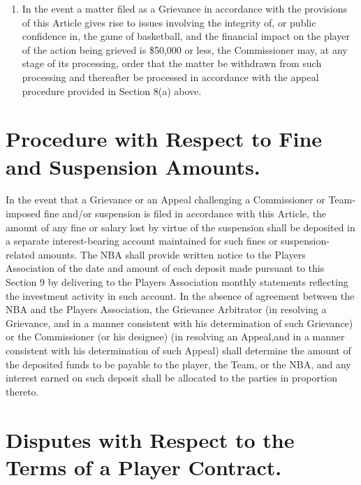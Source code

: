 \documentclass[
]{book}
\begin{document}
\begin{enumerate}
\item
  In the event a matter filed as a Grievance in accordance with the provisions of this Article gives rise to issues involving the integrity of, or public confidence in, the game of basketball, and the financial impact on the player of the action being grieved is \$50,000 or less, the Commissioner may, at any stage of its processing, order that the matter be withdrawn from such processing and thereafter be processed in accordance with the appeal procedure provided in Section 8(a) above.
\end{enumerate}

\hypertarget{procedure-with-respect-to-fine-and-suspension-amounts.}{%
\section{Procedure with Respect to Fine and Suspension Amounts.}\label{procedure-with-respect-to-fine-and-suspension-amounts.}}

In the event that a Grievance or an Appeal challenging a Commissioner or Team-imposed fine and/or suspension is filed in accordance with this Article, the amount of any fine or salary lost by virtue of the suspension shall be deposited in a separate interest-bearing account maintained for such fines or suspension-related amounts. The NBA shall provide written notice to the Players Association of the date and amount of each deposit made pursuant to this Section 9 by delivering to the Players Association monthly statements reflecting the investment activity in such account. In the absence of agreement between the NBA and the Players Association, the Grievance Arbitrator (in resolving a Grievance, and in a manner consistent with his determination of such Grievance) or the Commissioner (or his designee) (in resolving an Appeal,and in a manner consistent with his determination of such Appeal) shall determine the amount of the deposited funds to be payable to the player, the Team, or the NBA, and any interest earned on such deposit shall be allocated to the parties in proportion thereto.

\hypertarget{disputes-with-respect-to-the-terms-of-a-player-contract.}{%
\section{Disputes with Respect to the Terms of a Player Contract.}\label{disputes-with-respect-to-the-terms-of-a-player-contract.}}
\end{document}
